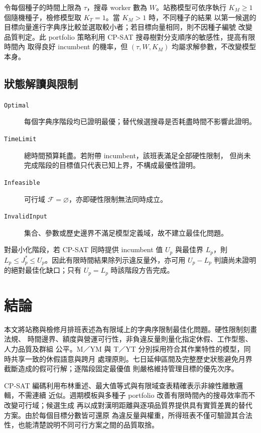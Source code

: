 \documentclass[a4paper,12pt]{article}
\begin{document}
令每個種子的時間上限為 \(\tau\)，搜尋 worker 數為 \(W\)。站務模型可依序執行
\(K_M\geq1\) 個隨機種子，檢修模型取 \(K_T=1\)。當 \(K_M>1\) 時，不同種子的結果
以第一候選的目標向量進行字典序比較並選取較小者；若目標向量相同，則不因種子編號
改變品質判定。此 portfolio 策略利用 CP-SAT 搜尋樹對分支順序的敏感性，提高有限時間內
取得良好 incumbent 的機率，但 \((\tau,W,K_M)\) 均屬求解參數，不改變模型本身。

\subsection{狀態解讀與限制}

\begin{description}
  \item[\texttt{Optimal}] 每個字典序階段均已證明最優；替代候選搜尋是否耗盡時間不影響此證明。
  \item[\texttt{TimeLimit}] 總時間預算耗盡。若附帶 incumbent，該班表滿足全部硬性限制，
    但尚未完成階段的目標值只代表已知上界，不構成最優性證明。
  \item[\texttt{Infeasible}] 可行域 \(\mathcal F=\varnothing\)，亦即硬性限制無法同時成立。
  \item[\texttt{InvalidInput}] 集合、參數或歷史邊界不滿足模型定義域，故不建立最佳化問題。
\end{description}

對最小化階段，若 CP-SAT 同時提供 incumbent 值 \(U_p\) 與最佳界 \(L_p\)，則
\(L_p\leq J_p^*\leq U_p\)。因此有限時間結果除列示違反量外，亦可用
\(U_p-L_p\) 判讀尚未證明的絕對最佳化缺口；只有 \(U_p=L_p\) 時該階段方告完成。

\section{結論}

本文將站務與檢修月排班表述為有限域上的字典序限制最佳化問題。硬性限制刻畫法規、
時間邊界、額度與營運可行性，非負違反量則量化指定休假、工作型態、人力品質及群組
公平。M／YM 與 T／YT 分別採用符合其作業特性的模型，同時共享一致的休假語意與跨月
處理原則。七日延伸區間及完整歷史狀態避免月界截斷造成的假可行解；逐階段固定最優值
則嚴格維持管理目標的優先次序。

CP-SAT 編碼利用布林重述、最大值等式與有限域查表精確表示非線性離散邏輯，不需連續
近似。週期模板與多種子 portfolio 改善有限時間內的搜尋效率而不改變可行域；候選生成
再以成對漢明距離與逐項品質界提供具有實質差異的替代方案。由於每個目標分數皆可還原
為違反量與權重，所得班表不僅可驗證其合法性，也能清楚說明不同可行方案之間的品質取捨。
\end{document}
